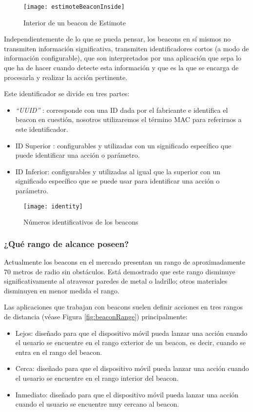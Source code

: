 \begin{figure}[h]
	\centering
	\texttt{[image: estimoteBeaconInside]}
	\caption{Interior de un beacon de Estimote}
	\label{fig:beaconInside}
\end{figure}

Independientemente de lo que se pueda pensar, los beacons en sí mismos no transmiten información significativa, transmiten identificadores cortos (a modo de información configurable), que son interpretados por una aplicación que sepa lo que ha de hacer cuando detecte esta información y que es la que se encarga de procesarla y realizar la acción pertinente.

Este identificador se divide en tres partes: 

\begin{itemize}
\item \textit{"`UUID"'} \cite{URL::UUID} : corresponde con una ID dada por el fabricante e identifica el beacon en cuestión, nosotros utilizaremos el término MAC para referirnos a este identificador. \label{el:mac}
\item ID Superior : configurables y utilizadas con un significado específico que puede identificar una acción o parámetro. 
\item ID Inferior: configurables y utilizadas al igual que la superior con un significado específico que se puede usar para identificar una acción o parámetro.
\end{itemize}

\begin{figure}[h]
	\centering
	\texttt{[image: identity]}
	\caption{Números identificativos de los beacons}
	\label{fig:beaconId}
\end{figure}

\subsubsection{¿Qué rango de alcance poseen?}

Actualmente los beacons en el mercado presentan un rango de aproximadamente 70 metros de radio sin obstáculos. Está demostrado que este rango disminuye significativamente al atravesar paredes de metal o ladrillo; otros materiales disminuyen en menor medida el rango. 

Las aplicaciones que trabajan con beacons suelen definir acciones en tres rangos de distancia (véase Figura \ref{fig:beaconRange}) principalmente: 

\begin{itemize}
\item Lejos: diseñado para que el dispositivo móvil pueda lanzar una acción cuando el usuario se encuentre en el rango exterior de un beacon, es decir, cuando se entra en el rango del beacon.
\item Cerca: diseñado para que el dispositivo móvil pueda lanzar una acción cuando el usuario se encuentre en el rango interior del beacon. 
\item Inmediato: diseñado para que el dispositivo móvil pueda lanzar una acción cuando el usuario se encuentre muy cercano al beacon.
\end{itemize}

